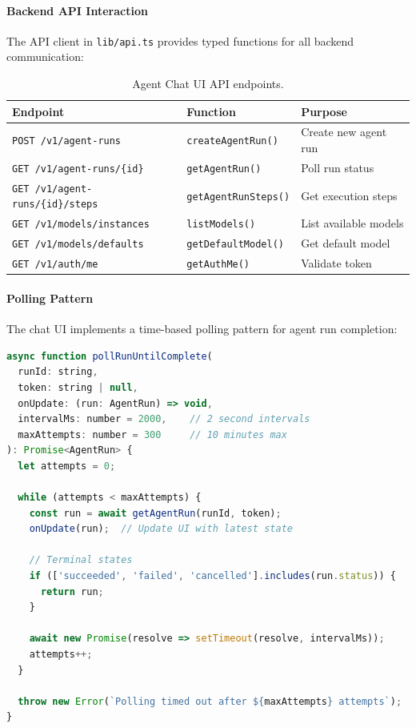 \paragraph{Backend API Interaction}
The API client in \texttt{lib/api.ts} provides typed functions for all backend communication:

\begin{table}[htbp]
    \centering
    \caption{Agent Chat UI API endpoints.}
    \label{tab:chat-api-endpoints}
    \small
    \begin{tabular}{lll}
        \toprule
        \textbf{Endpoint} & \textbf{Function} & \textbf{Purpose} \\
        \midrule
        \texttt{POST /v1/agent-runs} & \texttt{createAgentRun()} & Create new agent run \\
        \texttt{GET /v1/agent-runs/\{id\}} & \texttt{getAgentRun()} & Poll run status \\
        \texttt{GET /v1/agent-runs/\{id\}/steps} & \texttt{getAgentRunSteps()} & Get execution steps \\
        \texttt{GET /v1/models/instances} & \texttt{listModels()} & List available models \\
        \texttt{GET /v1/models/defaults} & \texttt{getDefaultModel()} & Get default model \\
        \texttt{GET /v1/auth/me} & \texttt{getAuthMe()} & Validate token \\
        \bottomrule
    \end{tabular}
\end{table}

\paragraph{Polling Pattern}
The chat UI implements a time-based polling pattern for agent run completion:

\begin{lstlisting}[language=JavaScript, caption={Run completion polling implementation.}]
async function pollRunUntilComplete(
  runId: string,
  token: string | null,
  onUpdate: (run: AgentRun) => void,
  intervalMs: number = 2000,    // 2 second intervals
  maxAttempts: number = 300     // 10 minutes max
): Promise<AgentRun> {
  let attempts = 0;
  
  while (attempts < maxAttempts) {
    const run = await getAgentRun(runId, token);
    onUpdate(run);  // Update UI with latest state
    
    // Terminal states
    if (['succeeded', 'failed', 'cancelled'].includes(run.status)) {
      return run;
    }
    
    await new Promise(resolve => setTimeout(resolve, intervalMs));
    attempts++;
  }
  
  throw new Error(`Polling timed out after ${maxAttempts} attempts`);
}
\end{lstlisting}


